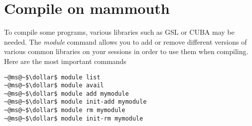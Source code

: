 \documentclass[10pt,letter]{article}
\newcommand{\dollar}{\mbox{\textdollar}}
\begin{document}
\section{Compile on mammouth}

To compile some programs, various libraries such as GSL or CUBA may be needed. The \emph{module} command allows you to  add or remove different versions of various common libraries on your sessions in order to use them when compiling. Here are the most important commands
\begin{lstlisting}[style=BashInputStyle]
~@ms@~$\dollar$ module list
~@ms@~$\dollar$ module avail
~@ms@~$\dollar$ module add mymodule
~@ms@~$\dollar$ module init-add mymodule
~@ms@~$\dollar$ module rm mymodule
~@ms@~$\dollar$ module init-rm mymodule
\end{lstlisting}
\end{document}
